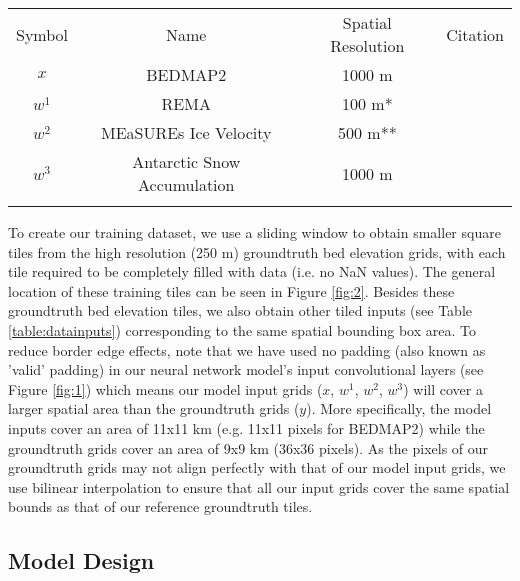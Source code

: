\documentclass[tc, manuscript]{copernicus}
\begin{document}
\begin{table*}[ht]
  \caption{Remote Sensing dataset inputs into the DeepBedMap neural network model.}
  \label{table:datainputs}
  \begin{tabular}{cccc}
  \tophline
  Symbol & Name & Spatial Resolution & Citation \\
  \middlehline
  $x$ & BEDMAP2 & 1000 m & \cite{FretwellBedmap2improvedice2013} \\
  $w^1$ & REMA & 100 m* & \cite{HowatReferenceElevationModel2019} \\
  $w^2$ & MEaSUREs Ice Velocity & 500 m** & \cite{MouginotContinentwideinterferometric2019} \\
  $w^3$ & Antarctic Snow Accumulation & 1000 m & \cite{ArthernAntarcticsnowaccumulation2006} \\
  \bottomhline
  \end{tabular}
\end{table*}

To create our training dataset, we use a sliding window to obtain smaller square tiles from the high resolution (250 m) groundtruth bed elevation grids, with each tile required to be completely filled with data (i.e. no NaN values).
The general location of these training tiles can be seen in Figure \ref{fig:2}.
Besides these groundtruth bed elevation tiles, we also obtain other tiled inputs (see Table \ref{table:datainputs}) corresponding to the same spatial bounding box area.
To reduce border edge effects, note that we have used no padding (also known as 'valid' padding) in our neural network model's input convolutional layers (see Figure \ref{fig:1}) which means our model input grids ($x$, $w^1$, $w^2$, $w^3$) will cover a larger spatial area than the groundtruth grids ($y$).
More specifically, the model inputs cover an area of 11x11 km (e.g. 11x11 pixels for BEDMAP2) while the groundtruth grids cover an area of 9x9 km (36x36 pixels).
As the pixels of our groundtruth grids may not align perfectly with that of our model input grids, we use bilinear interpolation to ensure that all our input grids cover the same spatial bounds as that of our reference groundtruth tiles.

\subsection{Model Design}
\end{document}
